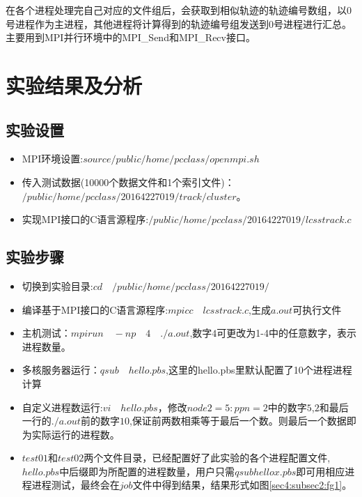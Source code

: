 \documentclass[UTF8]{ctexart}
\begin{document}
在各个进程处理完自己对应的文件组后，会获取到相似轨迹的轨迹编号数组，以0号进程作为主进程，其他进程将计算得到的轨迹编号组发送到0号进程进行汇总。
主要用到MPI并行环境中的MPI\_Send和MPI\_Recv接口。

\section{实验结果及分析}\label{sec4}

\subsection{实验设置}

\begin{itemize}
	\item MPI环境设置:$source /public/home/pcclass/openmpi.sh$
	\item 传入测试数据(10000个数据文件和1个索引文件)：$/public/home/pcclass/20164227019/track/cluster$。
	\item 实现MPI接口的C语言源程序:$/public/home/pcclass/20164227019/lcsstrack.c$
\end{itemize}

\subsection{实验步骤}
\label{sec4:subsec2}

\begin{itemize}
	\item 切换到实验目录:$cd \quad /public/home/pcclass/20164227019/$
	\item 编译基于MPI接口的C语言源程序:$mpicc \quad lcsstrack.c$,生成$a.out$可执行文件
	\item 主机测试：$mpirun \quad -np \quad 4 \quad ./a.out$,数字$4$可更改为1-4中的任意数字，表示进程数量。
	\item 多核服务器运行：$qsub \quad hello.pbs$,这里的hello.pbs里默认配置了10个进程进程计算
	\item 自定义进程数运行:$vi \quad hello.pbs$，修改$node2=5:ppn=2$中的数字$5$,$2$和最后一行的$./a.out$前的数字$10$,保证前两数相乘等于最后一个数。则最后一个数据即为实际运行的进程数。
	\item $test01$和$test02$两个文件目录，已经配置好了此实验的各个进程配置文件,$hello.pbs$中后缀即为所配置的进程数量，用户只需$qsub hellox.pbs$即可用相应进程进程测试，最终会在$job$文件中得到结果，结果形式如图\ref{sec4:subsec2:fg1}。
\end{itemize}
\end{document}

